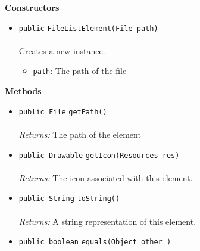 \textbf{\sffamily Constructors}
\begin{itemize}
\item \lstinline|public| \lstinline|FileListElement|\lstinline|(File path)|\\ \\[-0.6em]
Creates a new instance.
\begin{itemize}
\item \lstinline|path|: The path of the file
\end{itemize}



\end{itemize}


\textbf{\sffamily Methods}
\begin{itemize}
\item \lstinline|public File| \lstinline|getPath|\lstinline|()|\\ \\[-0.6em]
\emph{Returns:} The path of the element



\item \lstinline|public Drawable| \lstinline|getIcon|\lstinline|(Resources res)|\\ \\[-0.6em]
\emph{Returns:} The icon associated with this element.



\item \lstinline|public String| \lstinline|toString|\lstinline|()|\\ \\[-0.6em]
\emph{Returns:} A string representation of this element.



\item \lstinline|public boolean| \lstinline|equals|\lstinline|(Object other_)| \\[-0.6em]




\end{itemize}

